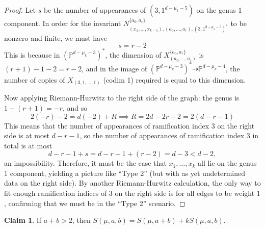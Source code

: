 \documentclass[11pt]{article}           %
\renewcommand{\P}{\mathbb P}
\theoremstyle{definition}
\newtheorem*{claim}{Claim}
\theoremstyle{definition}
\begin{document}
\begin{proof}
\begin{tikzpicture}
\end{tikzpicture}

Let $s$ be the number of appearances of $(3,1^{d-\mu_k-5})$ on the genus 1 component. In order
for the invariant $N_{(x_1,\dots,x_{k-1}),(a_0,\dots,a_r),(3,1^{d-\mu_k-5})^s}^{\{a_0,a_r\}}$ to be nonzero and finite, we must have
\[
s=r-2
\]
This is because in $(\P^{d-\mu_k-3})^*$, the dimension of $X_{(a_0,\dots,a_r)}^{\{a_0,a_r\}}$ is
$(r+1)-1-2=r-2$, and in the image of $(\P^{d-\mu_k-3})^*\dashrightarrow \P^{d-\mu_k-4}$, the number
of copies of $X_{(3,1,\dots,1)}$ (codim 1) required is equal to this dimension.

Now applying Riemann-Hurwitz to the right side of the graph: the genus is $1-(r+1)=-r$, and
so
\[
2(-r)-2=d(-2)+R\implies R=2d-2r-2=2(d-r-1)
\]
This means that the number of appearances of ramification index $3$ on the right side is at
most $d-r-1$, so the number of appearances of ramification index $3$ in total is at most
\[
d-r-1+s=d-r-1+(r-2)=d-3<d-2,
\]
an impossibility. Therefore, it must be the case that $x_1,\dots,x_k$ all lie on the genus
$1$ component, yielding a picture like ``Type 2'' (but with as yet undetermined data on the right side). By another Riemann-Hurwitz calculation, the only way to fit enough ramification indices of $3$
on the right side is for all edges to be weight $1$, confirming that we must be in the ``Type 2'' scenario.
  
\end{proof}

\begin{claim} If $a+b>2$, then $S(\mu,a,b)=S(\mu,a+b)+kS(\mu,a,b)$.
\end{claim}
\end{document}
